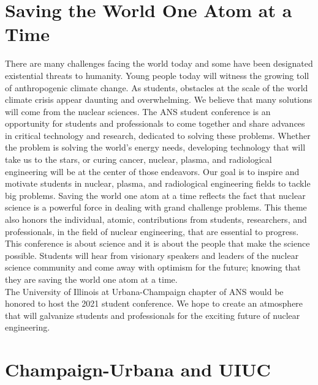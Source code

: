 \documentclass[12pt, letterpaper]{article}
\begin{document}
\section{Saving the World One Atom at a Time}
There are many challenges facing the world today and some have been designated existential threats to humanity. Young people today will witness the growing toll of anthropogenic climate change. As students, obstacles at the scale of the world climate crisis appear daunting and overwhelming. We believe that many solutions will come from the nuclear sciences. The ANS student conference is an opportunity for students and professionals to come together and share advances in critical technology and research, dedicated to solving these problems. Whether the problem is solving the world’s energy needs, developing technology that will take us to the stars, or curing cancer, nuclear, plasma, and radiological engineering will be at the center of those endeavors. Our goal is to inspire and motivate students in nuclear, plasma, and radiological engineering fields to tackle big problems. Saving the world one atom at a time reflects the fact that nuclear science is a powerful force in dealing with grand challenge problems. This theme also honors the individual, atomic, contributions from students, researchers, and professionals, in the field of nuclear engineering, that are essential to progress. This conference is about science and it is about the people that make the science possible. Students will hear from visionary speakers and leaders of the nuclear science community and come away with optimism for the future; knowing that they are saving the world one atom at a time.\\
The University of Illinois at Urbana-Champaign chapter of ANS would be honored to host the 2021 student conference. We hope to create an atmosphere that will galvanize students and professionals for the exciting future of nuclear engineering.


\newpage
\section{Champaign-Urbana and UIUC}
\end{document}
